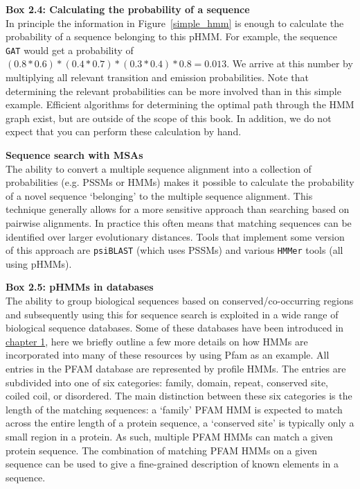 \begin{framed}
\textbf{Box 2.4: Calculating the probability of a sequence}\\
In principle the information in Figure~\ref{simple_hmm} is enough to calculate the probability of a sequence belonging to this pHMM. For example, the sequence \texttt{GAT} would get a probability of $(0.8 * 0.6) * (0.4 * 0.7) * (0.3 * 0.4) * 0.8 = 0.013$. We arrive at this number by multiplying all relevant transition and emission probabilities. Note that determining the relevant probabilities can be more involved than in this simple example. Efficient algorithms for determining the optimal path through the HMM graph exist, but are outside of the scope of this book. In addition, we do not expect that you can perform these calculation by hand.
\end{framed}

\begin{framed}
\textbf{Sequence search with MSAs}\\
The ability to convert a multiple sequence alignment into a collection of probabilities (e.g. PSSMs or HMMs) makes it possible to calculate the probability of a novel sequence `belonging' to the multiple sequence alignment. This technique generally allows for a more sensitive approach than searching based on pairwise alignments. In practice this often means that matching sequences can be identified over larger evolutionary distances. Tools that implement some version of this approach are \texttt{psiBLAST} (which uses PSSMs) and various \texttt{HMMer} tools (all using pHMMs).
\end{framed}

\begin{framed}
\textbf{Box 2.5: pHMMs in databases}\\
The ability to group biological sequences based on conserved/co-occurring regions and subsequently using this for sequence search is exploited in a wide range of biological sequence databases. Some of these databases have been introduced in \href{/chapter1}{chapter 1}, here we briefly outline a few more details on how HMMs are incorporated into many of these resources by using Pfam as an example. All entries in the PFAM database are represented by profile HMMs. The entries are subdivided into one of six categories: family, domain, repeat, conserved site, coiled coil, or disordered. The main distinction between these six categories is the length of the matching sequences: a `family' PFAM HMM is expected to match across the entire length of a protein sequence, a `conserved site' is typically only a small region in a protein. As such, multiple PFAM HMMs can match a given protein sequence. The combination of matching PFAM HMMs on a given sequence can be used to give a fine-grained description of known elements in a sequence.
\end{framed}

